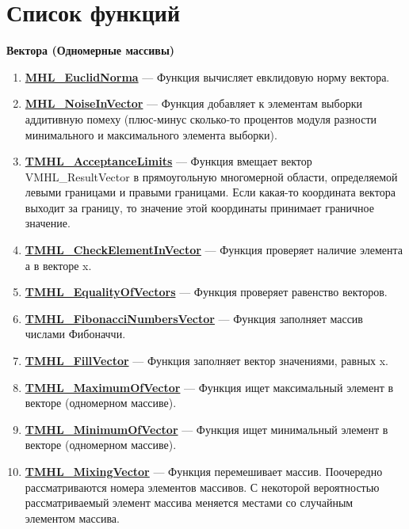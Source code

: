 \documentclass[a4paper,12pt]{article}
\begin{document}
\section{Список функций}\label{section_listfunctions}
\textbf{Вектора (Одномерные массивы)}
\begin{enumerate}

\item \textbf{\hyperref[MHL_EuclidNorma]{MHL\_EuclidNorma}} --- Функция вычисляет евклидовую норму вектора.

\item \textbf{\hyperref[MHL_NoiseInVector]{MHL\_NoiseInVector}} --- Функция добавляет к элементам выборки аддитивную помеху (плюс-минус сколько-то процентов модуля разности минимального и максимального элемента выборки).

\item \textbf{\hyperref[TMHL_AcceptanceLimits]{TMHL\_AcceptanceLimits}} --- Функция вмещает вектор VMHL\_ResultVector в прямоугольную многомерной области, определяемой левыми границами и правыми границами. Если какая-то координата вектора выходит за границу, то значение этой координаты принимает граничное значение.

\item \textbf{\hyperref[TMHL_CheckElementInVector]{TMHL\_CheckElementInVector}} --- Функция проверяет наличие элемента а в векторе x.

\item \textbf{\hyperref[TMHL_EqualityOfVectors]{TMHL\_EqualityOfVectors}} --- Функция проверяет равенство векторов.

\item \textbf{\hyperref[TMHL_FibonacciNumbersVector]{TMHL\_FibonacciNumbersVector}} --- Функция заполняет массив числами Фибоначчи.

\item \textbf{\hyperref[TMHL_FillVector]{TMHL\_FillVector}} --- Функция заполняет вектор значениями, равных x.

\item \textbf{\hyperref[TMHL_MaximumOfVector]{TMHL\_MaximumOfVector}} --- Функция ищет максимальный элемент в векторе (одномерном массиве).

\item \textbf{\hyperref[TMHL_MinimumOfVector]{TMHL\_MinimumOfVector}} --- Функция ищет минимальный элемент в векторе (одномерном массиве).

\item \textbf{\hyperref[TMHL_MixingVector]{TMHL\_MixingVector}} --- Функция перемешивает массив. Поочередно рассматриваются номера элементов массивов. С некоторой вероятностью рассматриваемый элемент массива меняется местами со случайным элементом массива.


\end{enumerate}
\end{document}
